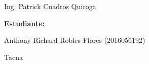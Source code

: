 \documentclass[12pt,letterpaper]{article}
\begin{document}
\begin{titlepage}
\begin{center}
\vspace*{0.1in}
\begin{large}
 Ing. Patrick Cuadros Quiroga\\
\end{large}

\vspace*{0.4in}
\vspace*{0.1in}
\begin{large}
\textbf{Estudiante:} \\
\begin{flushleft}
Anthony Richard Robles Flores  \hfill	(2016056192)\\

\centering  %
\vspace*{0.9in}
\begin{large}
Tacna\\ 
\end{large}

\end{flushleft}
\end{large}
\end{center}

\end{titlepage}


\tableofcontents %
\thispagestyle{empty} %
\newpage
\setcounter{page}{1} %




\end{document}
